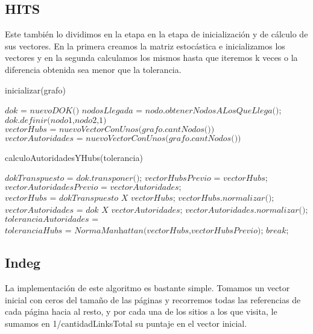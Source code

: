 \subsection{HITS}
Este también lo dividimos en la etapa en la etapa de inicialización y de cálculo de sus vectores. En la primera creamos la matriz estocástica e inicializamos los vectores y en la segunda calculamos los mismos hasta que iteremos k veces o la diferencia obtenida sea menor que la tolerancia.

\begin{algorithm}
\caption{inicializar(grafo)}\label{euclid}
\begin{algorithmic}[1]
\State  $\textit{dok = nuevoDOK()}$
	\State $\textit{nodosLlegada = nodo.obtenerNodosALosQueLlega();}$	
		\State $\textit{dok.definir(nodo1,nodo2,1)}$ 
	\EndFor	
\EndFor
\State  $\textit{vectorHubs = nuevoVectorConUnos(grafo.cantNodos())}$
\State  $\textit{vectorAutoridades = nuevoVectorConUnos(grafo.cantNodos())}$
\end{algorithmic}
\end{algorithm}

\begin{algorithm}
\caption{calculoAutoridadesYHubs(tolerancia)}\label{euclid}
\begin{algorithmic}[1]
	\State $\textit{dokTranspuesto = dok.transponer();}$
	\State $\textit{vectorHubsPrevio = vectorHubs;}$
	\State $\textit{vectorAutoridadesPrevio = vectorAutoridades;}$
	\State $\textit{vectorHubs = dokTranspuesto X vectorHubs;}$
	\State $\textit{vectorHubs.normalizar();}$
	\State $\textit{vectorAutoridades = dok X vectorAutoridades;}$
	\State $\textit{vectorAutoridades.normalizar();}$
	\State $\textit{toleranciaAutoridades = NormaManhattan(vectorAutoridades,vectorAutoridadesPrevio);}$
	\State $\textit{toleranciaHubs = NormaManhattan(vectorHubs,vectorHubsPrevio);}$
		\State $\textit{break;}$
	\EndIf
\EndFor
\end{algorithmic}
\end{algorithm}

\subsection{Indeg}

La implementación de este algoritmo es bastante simple. Tomamos un vector inicial con ceros del tamaño de las páginas y recorremos todas las referencias de cada página hacia al resto, y por cada una de los sitios a los que visita, le sumamos en 1/cantidadLinksTotal su puntaje en el vector inicial.

